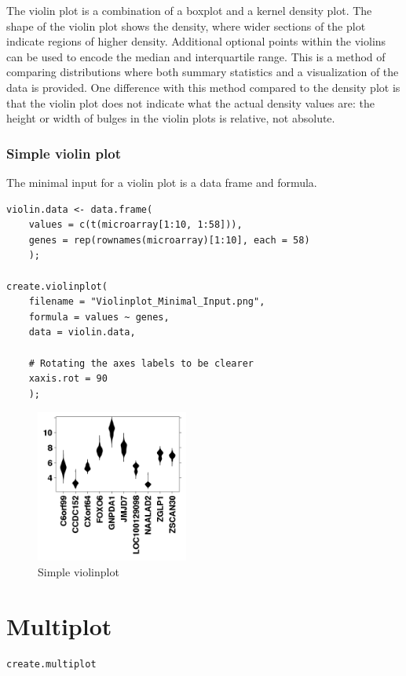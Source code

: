 \documentclass[letterpaper]{article}
\begin{document}
The violin plot is a combination of a boxplot and a kernel density plot. The shape of the violin plot shows the density, where wider sections of the plot indicate regions of higher density. Additional optional points within the violins can be used to encode the median and interquartile range. This is a method of comparing distributions where both summary statistics and a visualization of the data is provided. One difference with this method compared to the density plot is that the violin plot does not indicate what the actual density values are: the height or width of bulges in the violin plots is relative, not absolute.

\subsubsection{Simple violin plot}
The minimal input for a violin plot is a data frame and formula.
\begin{verbatim}
violin.data <- data.frame(
    values = c(t(microarray[1:10, 1:58])),
    genes = rep(rownames(microarray)[1:10], each = 58)
    );

create.violinplot(
    filename = "Violinplot_Minimal_Input.png",
    formula = values ~ genes,
    data = violin.data,

    # Rotating the axes labels to be clearer
    xaxis.rot = 90
    );
\end{verbatim}

\begin{figure}[!ht]
  \begin{center}
     \includegraphics[width=50mm]{Figures/Violinplot_Minimal_Input.png}
     \caption{Simple violinplot}
  \end{center}
\end{figure}

\section{Multiplot}
\begin{verbatim}
create.multiplot
\end{verbatim}
\end{document}
